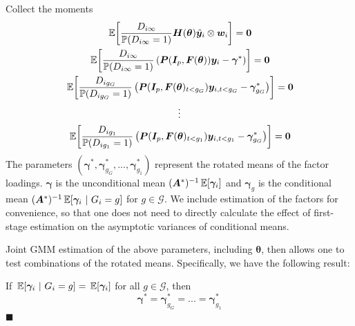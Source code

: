 \documentclass[12pt]{article}
\begin{document}
Collect the moments 
\begin{gather*}
    \expec{\frac{D_{i \infty}}{\mathbb{P}(D_{i \infty} = 1)}\bm H(\bm \theta) \tilde{\bm y}_i \otimes \bm w_i} = \bm 0\\
    \expec{\frac{D_{i \infty}}{\mathbb{P}(D_{i \infty} = 1)} \left( \bm P(\bm I_p, \bm F(\bm \theta)) \bm y_i - \bm \gamma^* \right)} = \bm 0\\
    \expec{\frac{D_{i g_G}}{\mathbb{P}(D_{ig_G} = 1)} \left( \bm P(\bm I_p, \bm F(\bm \theta)_{t < g_G}) \bm y_{i,t < g_G} - \bm \gamma_{g_G}^* \right) } = \bm 0\\
    \vdots\\
    \expec{\frac{D_{i g_1}}{\mathbb{P}(D_{ig_1} = 1)} \left( \bm P(\bm I_p, \bm F(\bm \theta)_{t < g_1}) \bm y_{i,t < g_1} - \bm \gamma_{g_G}^* \right) } = \bm 0
\end{gather*}
The parameters $(\bm \gamma^*, \bm \gamma_{g_G}^*,...,\bm \gamma_{g_1}^*)$ represent the rotated means of the factor loadings. $\bm \gamma$ is the unconditional mean $(\bm A^*)^{-1}\expec{\bm \gamma_i}$ and $\bm \gamma_g$ is the conditional mean $(\bm A^*)^{-1}\E{\bm \gamma_i}{G_i = g}$ for $g \in \mathcal{G}$. We include estimation of the factors for convenience, so that one does not need to directly calculate the effect of first-stage estimation on the asymptotic variances of conditional means. 

Joint GMM estimation of the above parameters, including $\bm \theta$, then allows one to test combinations of the rotated means. Specifically, we have the following result: 
\begin{theorem}\label{theorem:rotated_means}
    If $\E{\bm \gamma_i}{G_i = g} = \expec{\bm \gamma_i}$ for all $g \in \mathcal{G}$, then
    \begin{equation}
        \bm \gamma^* = \bm \gamma_{g_G}^* = ... = \bm \gamma_{g_1}^*
    \end{equation}
    $\blacksquare$
\end{theorem}
\end{document}
